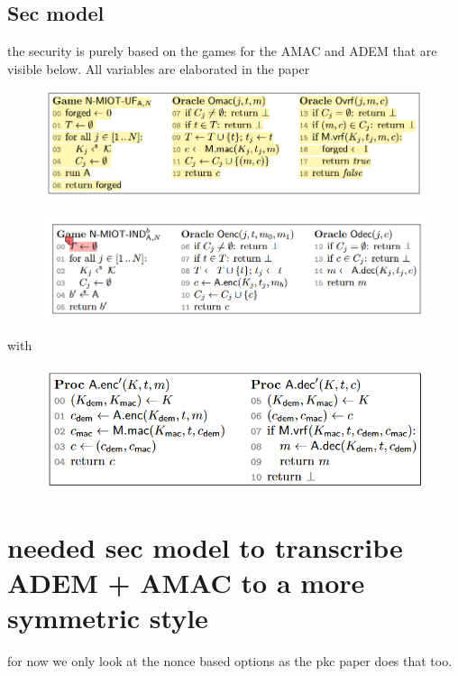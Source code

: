 \documentclass{article}
\begin{document}
\subsection{Sec model}
the security is purely based on the games for the AMAC and ADEM that are visible below. All variables are elaborated in the paper
\begin{figure}[H]
    \centering
    \includegraphics[scale = 0.5]{images/game mac.png}
\end{figure}
\begin{figure}[H]
    \centering
    \includegraphics[scale = 0.5]{images/game adem.png}
\end{figure}
with
\begin{figure}[H]
    \centering
    \includegraphics[scale = 0.5]{images/adem amac.png}
\end{figure}


\newpage
\section{needed sec model to transcribe ADEM + AMAC to a more symmetric style}
for now we only look at the nonce based options as the pkc paper does that too.
\end{document}
